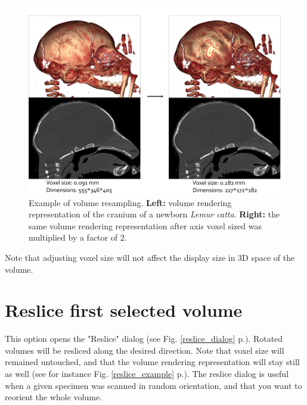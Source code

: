 \begin{figure}
  \centering
  \includegraphics[scale=0.25]{images/14/resample/resample_example.png}
\caption{ Example of volume resampling. \textbf{Left:} volume rendering representation of the cranium of a newborn \textit{Lemur catta}. \textbf{Right:} the same volume rendering representation after axis voxel sized was multiplied by a factor of 2.}	
\label{resample_example}
 \end{figure}
Note that adjusting voxel size will not affect the display size in 3D space of the volume.




\section{Reslice first selected volume}


This option opens the "Reslice" dialog (see Fig. \ref{reslice_dialog} p.\pageref{reslice_dialog}). Rotated volumes will be resliced along the desired direction. Note that voxel size will remained untouched, and that the volume rendering representation will stay still as well (see for instance Fig. \ref{reslice_example} p.\pageref{reslice_example}). The reslice dialog is useful when a given specimen was scanned in random orientation, and that you want to reorient the whole volume.
 
